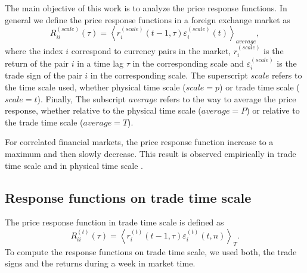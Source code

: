 The main objective of this work is to analyze the price response functions. In
general we define the price response functions in a foreign exchange market as
\begin{equation}\label{eq:response_general}
    R^{\left(scale\right)}_{ii}\left(\tau\right)=\left\langle
    r^{\left(scale\right)}_{i}\left(t-1, \tau\right)
    \varepsilon^{\left(scale\right)}_{i} \left(t\right)\right\rangle_{average},
\end{equation}
where the index $i$ correspond to currency pairs in the market,
$r^{\left(scale\right)}_{i}$ is the return of the pair $i$ in a time lag $\tau$
in the corresponding scale and $\varepsilon^{\left(scale\right)}_{i}$ is the
trade sign of the pair $i$ in the corresponding scale. The superscript $scale$
refers to the time scale used, whether physical time scale
($scale = p$) or trade time scale ($scale = t$). Finally, The subscript
$average$ refers to the way to average the price response, whether relative to
the physical time scale ($average = P$) or relative to the trade time scale
($average = T$).

For correlated financial markets, the price response function increase to a
maximum and then slowly decrease. This result is observed empirically in trade
time scale and in physical time scale
\cite{my_paper_response_financial,Wang_2016_avg}.

\subsection{Response functions on trade time scale}
\label{subsec:response_function_trade}

The price response function in trade time scale is defined as
\cite{my_paper_response_financial}
\begin{equation}\label{eq:response_functions_trade_scale_general}
    R^{\left(t\right)}_{ii}\left(\tau\right)=\left\langle r^{\left(t\right)}
    _{i}\left(t-1,\tau \right)\varepsilon_{i}^{\left(t\right)}
    \left(t, n\right)\right\rangle _{T}.
\end{equation}
To compute the response functions on trade time scale, we used both, the trade
signs and the returns during a week in market time.

